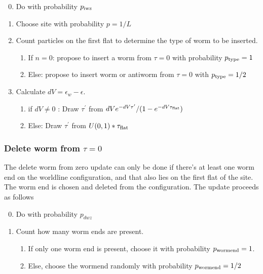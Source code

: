 \documentclass[12pt, two sided]{article}
\begin{document}
    \begin{enumerate}
        \setcounter{enumi}{-1}
    \item Do with probability $p_{\rm{iwz}}$
    \item Choose site with probability $p=1/L$
    \item Count particles on the first flat to determine the type of worm to be inserted.
    \begin{enumerate}
    \item{If $n=0$: propose to insert a worm from $\tau=0$ with probability $p_{\rm{type}}=1$}
    \item{Else: propose to insert worm or antiworm from $\tau=0$ with $p_{\rm{type}}=1/2$}
    \end{enumerate}
    \item{Calculate $dV=\epsilon_{w}-\epsilon$.}
    \begin{enumerate}
    \item{if $dV \neq 0$ : Draw $\tau^\prime$ from $dV e^{-dV\tau^\prime}/(1-e^{-dV \tau_{\rm{flat}}})$}
    \item{Else: Draw $\tau^\prime$ from $U(0,1)*\tau_{\rm{flat}}$}
    \end{enumerate}
    \end{enumerate}

    \subsubsection{Delete worm from $\tau=0$}
    
    The delete worm from zero update can only be done if there's at least one worm end on the worldline configuration, and that also lies on the first flat of the site. The worm end is chosen and deleted from the configuration. The update proceeds as follows
    
    \begin{enumerate}
        \setcounter{enumi}{-1}
    \item Do with probability $p_{dwz}$
    \item Count how many worm ends are present.
    \begin{enumerate}
    \item{If only one worm end is present, choose it with probability $p_{\rm{wormend}}=1$}.
    \item{Else, choose the wormend randomly with probability $p_{\rm{wormend}}=1/2$}
    \end{enumerate}
    \end{enumerate}
    
\end{document}
